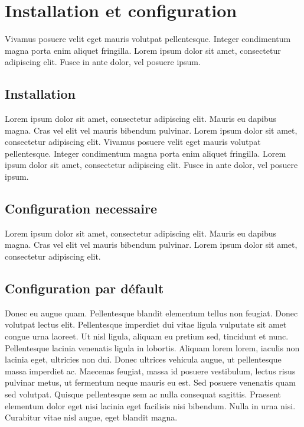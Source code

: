 \chapter{Installation et configuration}
Vivamus posuere velit eget mauris volutpat pellentesque. Integer condimentum magna porta enim aliquet fringilla. Lorem ipsum dolor sit amet, consectetur adipiscing elit. Fusce in ante dolor, vel posuere ipsum.
\section{Installation}
\label{sec:install}
Lorem ipsum dolor sit amet, consectetur adipiscing elit. Mauris eu dapibus magna. Cras vel elit vel mauris bibendum pulvinar. Lorem ipsum dolor sit amet, consectetur adipiscing elit. Vivamus posuere velit eget mauris volutpat pellentesque. Integer condimentum magna porta enim aliquet fringilla. Lorem ipsum dolor sit amet, consectetur adipiscing elit. Fusce in ante dolor, vel posuere ipsum.

\section{Configuration necessaire}
Lorem ipsum dolor sit amet, consectetur adipiscing elit. Mauris eu dapibus magna. Cras vel elit vel mauris bibendum pulvinar. Lorem ipsum dolor sit amet, consectetur adipiscing elit.


\section{Configuration par défault}
\label{sec:def}

Donec eu augue quam. Pellentesque blandit elementum tellus non feugiat. Donec volutpat lectus elit. Pellentesque imperdiet dui vitae ligula vulputate sit amet congue urna laoreet. Ut nisl ligula, aliquam eu pretium sed, tincidunt et nunc. Pellentesque lacinia venenatis ligula in lobortis. Aliquam lorem lorem, iaculis non lacinia eget, ultricies non dui. Donec ultrices vehicula augue, ut pellentesque massa imperdiet ac. Maecenas feugiat, massa id posuere vestibulum, lectus risus pulvinar metus, ut fermentum neque mauris eu est. Sed posuere venenatis quam sed volutpat. Quisque pellentesque sem ac nulla consequat sagittis. Praesent elementum dolor eget nisi lacinia eget facilisis nisi bibendum. Nulla in urna nisi. Curabitur vitae nisl augue, eget blandit magna. 

